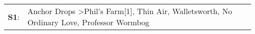 \begin{supertabular}{p{0.03\textwidth}p{0.92\textwidth}}
 \textbf{S1}:  &  Anchor Drops\textsuperscript{} \textgreater \enspace Phil's Farm[1]\textsuperscript{}, \enspace Thin Air\textsuperscript{}, \enspace Walletsworth\textsuperscript{}, \enspace No Ordinary Love\textsuperscript{}, \enspace Professor Wormbog\textsuperscript{}  \enspace  \\
\end{supertabular}
